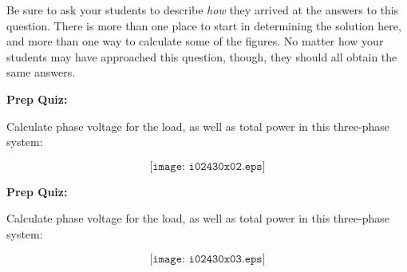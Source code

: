 
Be sure to ask your students to describe {\it how} they arrived at the answers to this question.  There is more than one place to start in determining the solution here, and more than one way to calculate some of the figures.  No matter how your students may have approached this question, though, they should all obtain the same answers.

\vfil \eject

\noindent
{\bf Prep Quiz:}

Calculate phase voltage for the load, as well as total power in this three-phase system:

$$\texttt{[image: i02430x02.eps]}$$


\vfil \eject

\noindent
{\bf Prep Quiz:}

Calculate phase voltage for the load, as well as total power in this three-phase system:

$$\texttt{[image: i02430x03.eps]}$$







